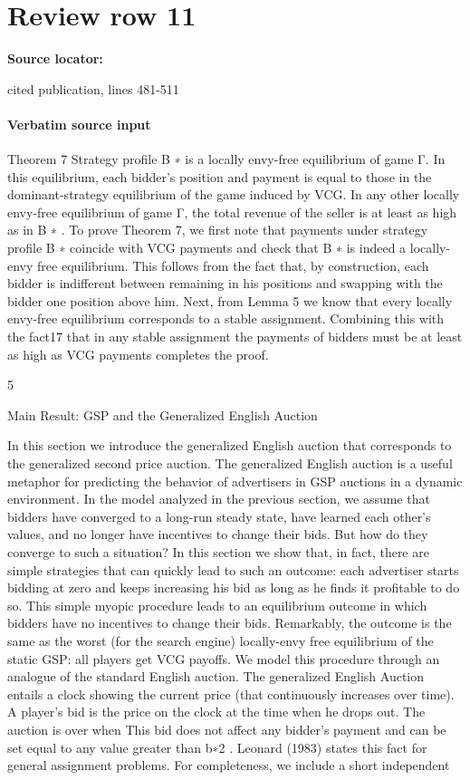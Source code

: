 \documentclass[10pt]{article}
\begin{document}
\section*{Review row 11}
\textbf{Source locator:} {\footnotesize\raggedright cited publication, lines 481-\allowbreak{}511\par}
\paragraph{Verbatim source input}
\begin{ReviewVerbatim}
Theorem 7 Strategy profile B ∗ is a locally envy-free equilibrium of game Γ. In this equilibrium,
each bidder’s position and payment is equal to those in the dominant-strategy equilibrium of the
game induced by VCG. In any other locally envy-free equilibrium of game Γ, the total revenue of
the seller is at least as high as in B ∗ .
To prove Theorem 7, we first note that payments under strategy profile B ∗ coincide with VCG
payments and check that B ∗ is indeed a locally-envy free equilibrium. This follows from the fact
that, by construction, each bidder is indifferent between remaining in his positions and swapping
with the bidder one position above him. Next, from Lemma 5 we know that every locally envy-free
equilibrium corresponds to a stable assignment. Combining this with the fact17 that in any stable
assignment the payments of bidders must be at least as high as VCG payments completes the proof.

5

Main Result: GSP and the Generalized English Auction

In this section we introduce the generalized English auction that corresponds to the generalized
second price auction. The generalized English auction is a useful metaphor for predicting the
behavior of advertisers in GSP auctions in a dynamic environment. In the model analyzed in the
previous section, we assume that bidders have converged to a long-run steady state, have learned
each other’s values, and no longer have incentives to change their bids. But how do they converge
to such a situation?
In this section we show that, in fact, there are simple strategies that can quickly lead to such
an outcome: each advertiser starts bidding at zero and keeps increasing his bid as long as he finds
it profitable to do so. This simple myopic procedure leads to an equilibrium outcome in which
bidders have no incentives to change their bids. Remarkably, the outcome is the same as the worst
(for the search engine) locally-envy free equilibrium of the static GSP: all players get VCG payoffs.
We model this procedure through an analogue of the standard English auction. The generalized
English Auction entails a clock showing the current price (that continuously increases over time).
A player’s bid is the price on the clock at the time when he drops out. The auction is over when
This bid does not affect any bidder’s payment and can be set equal to any value greater than b∗2 .
Leonard (1983) states this fact for general assignment problems. For completeness, we include a short independent


\end{ReviewVerbatim}
\end{document}
